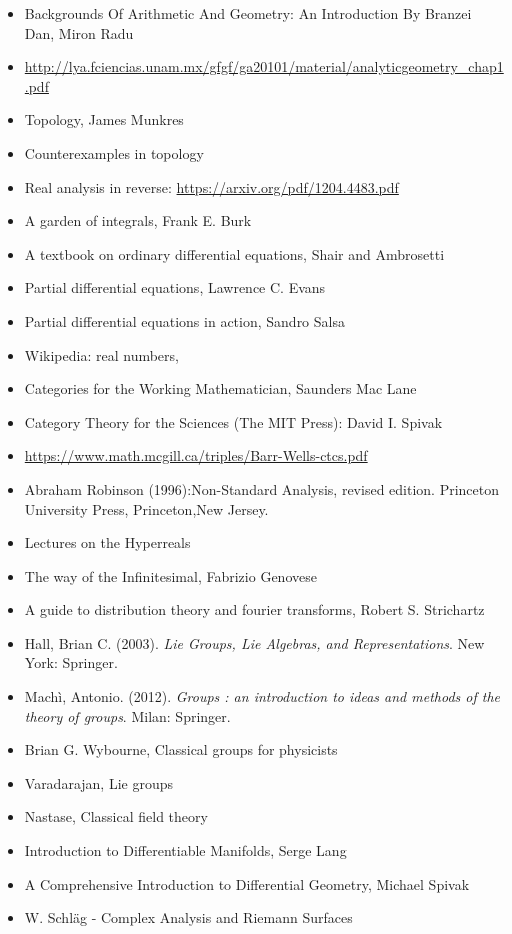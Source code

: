\documentclass{report}
\begin{document}
\begin{itemize}
\item Backgrounds Of Arithmetic And Geometry: An Introduction
By Branzei Dan, Miron Radu
\item \url{http://lya.fciencias.unam.mx/gfgf/ga20101/material/analyticgeometry_chap1.pdf}
\item Topology, James Munkres
\item Counterexamples in topology
\item Real analysis in reverse: \url{https://arxiv.org/pdf/1204.4483.pdf}
\item A garden of integrals, Frank E. Burk
\item A textbook on ordinary differential equations, Shair and Ambrosetti
\item Partial differential equations, Lawrence C. Evans
\item Partial differential equations in action, Sandro Salsa
\item Wikipedia: real numbers,
\item Categories for the Working Mathematician, Saunders Mac Lane
\item Category Theory for the Sciences (The MIT Press): David I. Spivak
\item \url{https://www.math.mcgill.ca/triples/Barr-Wells-ctcs.pdf}
\item Abraham Robinson (1996):Non-Standard Analysis, revised edition. Princeton University Press, Princeton,New Jersey.
\item Lectures on the Hyperreals
\item The way of the Infinitesimal, Fabrizio Genovese
\item A guide to distribution theory and fourier transforms, Robert S. Strichartz
\item Hall, Brian C. (2003). \textit{Lie Groups, Lie Algebras, and Representations}. New York: Springer.
\item Machì, Antonio. (2012). \textit{Groups : an introduction to ideas and methods of the theory of groups}. Milan: Springer.
\item Brian G. Wybourne, Classical groups for physicists
\item Varadarajan, Lie groups
\item Nastase, Classical field theory
\item Introduction to Differentiable Manifolds, Serge Lang
\item A Comprehensive Introduction to Differential Geometry, Michael Spivak
\item W. Schläg - Complex Analysis and Riemann Surfaces

\end{itemize}
\end{document}
